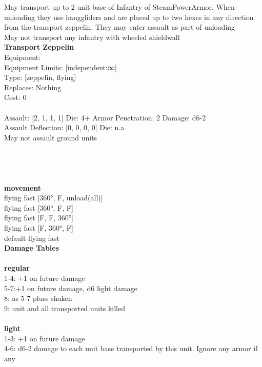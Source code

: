 \noindent May transport up to 2 unit base of Infantry of SteamPowerArmor. When unloading they use hanggliders and are placed up to two hexes in any direction from the transport zeppelin. They may enter assault as part of unloading\\ 
May not transport any infantry with wheeled shieldwall\\ 


{\bf Transport Zeppelin } \\
Equipment:  \\
Equipment Limits: [independent:∞] \\
Type: [zeppelin, flying] \\
Replaces: Nothing \\
Cost: 0\\
\ \\
Assault: [2, 1, 1, 1] Die: 4+ Armor Penetration: 2 Damage: d6-2 \\
Assault Deflection: [0, 0, 0, 0] Die: n.a\\
\indent May not assault ground units\\ 
 
\ \\

\ \\
 
\ \\



\ \\ {\bf movement } \\
flying fast [360°, F, unload(all)] \\
flying fast [360°, F, F] \\
flying fast [F, F, 360°] \\
flying fast [F, 360°, F] \\
default flying fast \\


{\bf Damage Tables} \\
\ \\ {\bf regular } \\
1-4: +1 on future damage \\
5-7:+1 on future damage, d6 light damage \\
8: as 5-7 pluss shaken \\
9: unit and all transported units killed \\
\ \\ {\bf light } \\
1-3: +1 on future damage \\
4-6: d6-2 damage to each unit base transported by this unit. Ignore any armor if any \\










